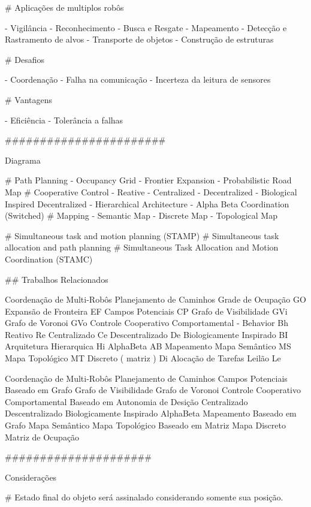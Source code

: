 
# Aplicações de multiplos robôs

- Vigilância
- Reconhecimento
- Busca e Resgate
- Mapeamento
- Detecção e Rastramento de alvos
- Transporte de objetos
- Construção de estruturas

# Desafios

- Coordenação
- Falha na comunicação
- Incerteza da leitura de sensores

# Vantagens

- Eficiência
- Tolerância a falhas

#######################

Diagrama

# Path Planning
	- Occupancy Grid
	- Frontier Expansion
	- Probabilistic Road Map
# Cooperative Control
	- Reative
	- Centralized
	- Decentralized
	- Biological Inspired Decentralized
	- Hierarchical Architecture
	- Alpha Beta Coordination (Switched)
# Mapping
	- Semantic Map
	- Discrete Map
	- Topological Map

# Simultaneous task and motion planning (STAMP)
# Simultaneous task allocation and path planning
# Simultaneous Task Allocation and Motion Coordination (STAMC)

## Trabalhos Relacionados

Coordenação de Multi-Robôs
	Planejamento de Caminhos
		Grade de Ocupação					GO
		Expansão de Fronteira			EF
		Campos Potenciais					CP
		Grafo de Visibilidade			GVi
		Grafo de Voronoi					GVo
	Controle Cooperativo
		Comportamental - Behavior	Bh
		Reativo										Re
		Centralizado							Ce
		Descentralizado 					De
		Biologicamente Inspirado	BI
		Arquitetura Hierarquica		Hi
		AlphaBeta									AB
	Mapeamento
		Mapa Semântico						MS
		Mapa Topológico						MT
		Discreto ( matriz )				Di
	Alocação de Tarefas
		Leilão										Le

Coordenação de Multi-Robôs
	Planejamento de Caminhos
		Campos Potenciais
		Baseado em Grafo
			Grafo de Visibilidade
			Grafo de Voronoi
	Controle Cooperativo
		Comportamental
		Baseado em Autonomia de Desição
			Centralizado
			Descentralizado
		Biologicamente Inspirado
		AlphaBeta
	Mapeamento
		Baseado em Grafo
			Mapa Semântico
			Mapa Topológico
		Baseado em Matriz
			Mapa Discreto
			Matriz de Ocupação

#####################

Considerações

# Estado final do objeto será assinalado considerando somente sua posição.


